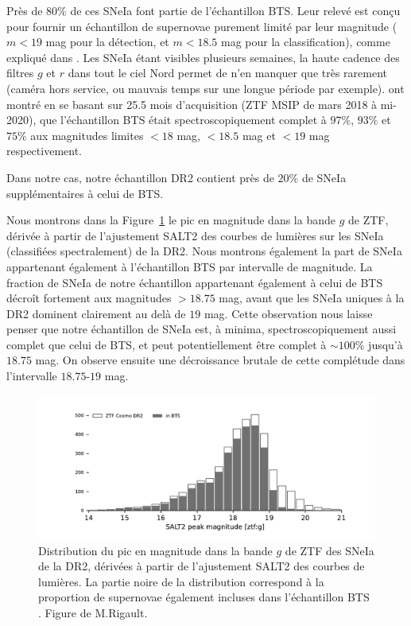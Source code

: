 \documentclass[../main/main.tex]{subfiles}
\begin{document}
Près de $80\%$ de ces SNeIa font partie de l'échantillon BTS. Leur relevé
est conçu pour fournir un échantillon de supernovae purement limité par
leur magnitude ($m<19$ mag pour la détection, et $m<18.5$ mag pour la
classification), comme expliqué dans
\citet{FremlingZTFspec2020,PerleyBTSII2020}. Les SNeIa étant visibles
plusieurs semaines, la haute cadence des filtres $g$ et $r$ dans tout le
ciel Nord permet de n'en manquer que très rarement (caméra hors service,
ou mauvais temps sur une longue période par
exemple). \citet{PerleyBTSII2020} ont montré en se basant sur 25.5 mois
d'acquisition (ZTF MSIP de mars 2018 à mi-2020), que l'échantillon BTS
était spectroscopiquement complet à $97\%$, $93\%$ et $75\%$ aux
magnitudes limites $<18$ mag, $<18.5$ mag et $<19$ mag respectivement.

Dans notre cas, notre échantillon DR2 contient près de $20\%$ de SNeIa
supplémentaires à celui de BTS.

Nous montrons dans la Figure~\ref{fig:target_peakmaggBTS} le pic en
magnitude dans la bande $g$ de ZTF, dérivée à partir de l'ajustement
SALT2 des courbes de lumières sur les SNeIa (classifiées spectralement) de
la DR2. Nous montrons également la part de SNeIa appartenant également à
l'échantillon BTS par intervalle de magnitude. La fraction de SNeIa de
notre échantillon appartenant également à celui de BTS décroît fortement
aux magnitudes $>18.75$ mag, avant que les SNeIa uniques à la DR2
dominent clairement au delà de $19$ mag. Cette observation nous laisse
penser que notre échantillon de SNeIa est, à minima, spectroscopiquement
aussi complet que celui de BTS, et peut potentiellement être complet à $\sim100\%$
jusqu'à $18.75$ mag. On observe ensuite une décroissance brutale de cette complétude dans l'intervalle $18.75$-$19$ mag.

\begin{figure}[ht]
  \centering
  \includegraphics[width=1\textwidth]{../figures/09_dr2/target_peakmagg.pdf}
  \caption[Distribution du pic en
magnitude dans la bande $g$ de ZTF des SNeIa de la DR2.]{Distribution du pic en
magnitude dans la bande $g$ de ZTF des SNeIa de la DR2, dérivées à partir de l'ajustement
SALT2 des courbes de lumières. La partie noire de la distribution
correspond à la proportion de supernovae également incluses dans
l'échantillon BTS \citep{FremlingZTFspec2020,PerleyBTSII2020}. Figure de M.Rigault.}
  \label{fig:target_peakmaggBTS}
\end{figure}
\end{document}
